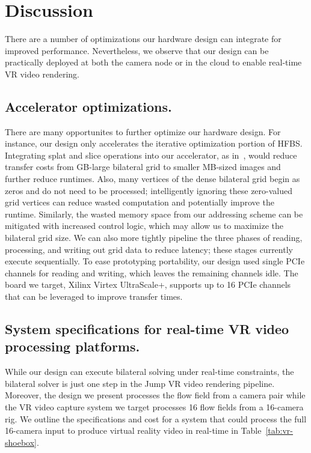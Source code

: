 \section{Discussion}
There are a number of optimizations our hardware design can integrate for improved performance.
Nevertheless, we observe that our design can be practically deployed at both the camera node or in the cloud to enable real-time VR video rendering.


\subsection{Accelerator optimizations.}
There are many opportunites to further optimize our hardware design.
For instance, our design only accelerates the iterative optimization portion of HFBS.
Integrating splat and slice operations into our accelerator, as in~\cite{bilat_isscc}, would reduce transfer costs from GB-large bilateral grid to smaller MB-sized images and further reduce runtimes.
Also, many vertices of the dense bilateral grid begin as zeros and do not need to be processed;  intelligently ignoring these zero-valued grid vertices can reduce wasted computation and potentially improve the runtime.
Similarly, the wasted memory space from our addressing scheme can be mitigated with increased control logic, which may allow us to maximize the bilateral grid size.
We can also more tightly pipeline the three phases of reading, processing, and writing out grid data to reduce latency; these stages currently execute sequentially.
To ease prototyping portability, our design used single PCIe channels for reading and writing, which leaves the remaining channels idle.
The board we target, Xilinx Virtex UltraScale+, supports up to 16 PCIe channels that can be leveraged to improve transfer times.

\subsection{System specifications for real-time VR video processing platforms.}
While our design can execute bilateral solving under real-time constraints, the bilateral solver is just one step in the Jump VR video rendering pipeline.
Moreover, the design we present processes the flow field from a camera pair while the VR video capture system we target processes 16 flow fields from a 16-camera rig.
We outline the specifications and cost for a system that could process the full 16-camera input to produce virtual reality video in real-time in Table~\ref{tab:vr-shoebox}.

